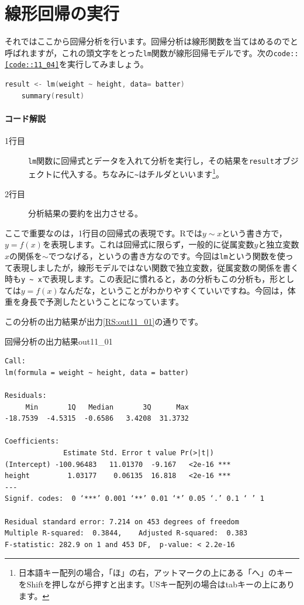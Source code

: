 \documentclass{ltjbook}
\begin{document}
\section{線形回帰の実行}
それではここから回帰分析を行います。回帰分析は線形関数を当てはめるのでと呼ばれますが，これの頭文字をとった\texttt{lm}関数が線形回帰モデルです。次の\texttt{code::\ref{code::11_04}}を実行してみましょう。
\begin{lstlisting}[language=c++,label={code::11_04},caption={回帰分析の実行}]
    result <- lm(weight ~ height, data= batter)
    summary(result)
\end{lstlisting}

\paragraph{コード解説}
\begin{description}
    \item[1行目] \texttt{lm}関数に回帰式とデータを入れて分析を実行し，その結果を\texttt{result}オブジェクトに代入する。ちなみに\verb|~|はチルダといいます\footnote{日本語キー配列の場合，「ほ」の右，アットマークの上にある「へ」のキーをShiftを押しながら押すと出ます。USキー配列の場合はtabキーの上にあります。}。
    \item[2行目] 分析結果の要約を出力させる。
\end{description}

ここで重要なのは，1行目の回帰式の表現です。Rでは$y\sim x $という書き方で，$y=f(x)$を表現します。これは回帰式に限らず，一般的に従属変数$y$と独立変数$x$の関係を$\sim$でつなげる，というの書き方なのです。今回は\texttt{lm}という関数を使って表現しましたが，線形モデルではない関数で独立変数，従属変数の関係を書く時も\verb|y ~ x|で表現します。この表記に慣れると，あの分析もこの分析も，形としては$y=f(x)$なんだな，ということがわかりやすくていいですね。今回は，体重を身長で予測したということになっています。

この分析の出力結果が出力\ref{RS:out11_01}の通りです。

\begin{Rscreen}{回帰分析の出力結果}{out11_01}
    \begin{verbatim}
Call:
lm(formula = weight ~ height, data = batter)

Residuals:
     Min       1Q   Median       3Q      Max 
-18.7539  -4.5315  -0.6586   3.4208  31.3732 

Coefficients:
              Estimate Std. Error t value Pr(>|t|)    
(Intercept) -100.96483   11.01370  -9.167   <2e-16 ***
height         1.03177    0.06135  16.818   <2e-16 ***
---
Signif. codes:  0 ‘***’ 0.001 ‘**’ 0.01 ‘*’ 0.05 ‘.’ 0.1 ‘ ’ 1

Residual standard error: 7.214 on 453 degrees of freedom
Multiple R-squared:  0.3844,	Adjusted R-squared:  0.383 
F-statistic: 282.9 on 1 and 453 DF,  p-value: < 2.2e-16
    \end{verbatim}
\end{Rscreen}
\end{document}
